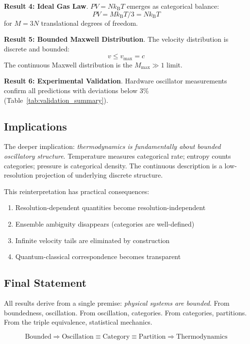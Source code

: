 \documentclass[twocolumn,10pt]{article}
\theoremstyle{definition}
\theoremstyle{remark}
\newcommand{\kB}{k_{\mathrm{B}}}
\begin{document}
\textbf{Result 4: Ideal Gas Law}. $PV = N\kB T$ emerges as categorical balance:
\begin{equation}
PV = M\kB T/3 = N\kB T
\end{equation}
for $M = 3N$ translational degrees of freedom.

\textbf{Result 5: Bounded Maxwell Distribution}. The velocity distribution is discrete and bounded:
\begin{equation}
v \leq v_{\max} = c
\end{equation}
The continuous Maxwell distribution is the $M_{\max} \gg 1$ limit.

\textbf{Result 6: Experimental Validation}. Hardware oscillator measurements confirm all predictions with deviations below 3\% (Table~\ref{tab:validation_summary}).

\subsection{Implications}

The deeper implication: \textit{thermodynamics is fundamentally about bounded oscillatory structure}. Temperature measures categorical rate; entropy counts categories; pressure is categorical density. The continuous description is a low-resolution projection of underlying discrete structure.

This reinterpretation has practical consequences:
\begin{enumerate}
\item Resolution-dependent quantities become resolution-independent
\item Ensemble ambiguity disappears (categories are well-defined)
\item Infinite velocity tails are eliminated by construction
\item Quantum-classical correspondence becomes transparent
\end{enumerate}

\subsection{Final Statement}

All results derive from a single premise: \textit{physical systems are bounded}. From boundedness, oscillation. From oscillation, categories. From categories, partitions. From the triple equivalence, statistical mechanics.

\begin{equation}
\boxed{\text{Bounded} \Rightarrow \text{Oscillation} \equiv \text{Category} \equiv \text{Partition} \Rightarrow \text{Thermodynamics}}
\end{equation}
\end{document}
